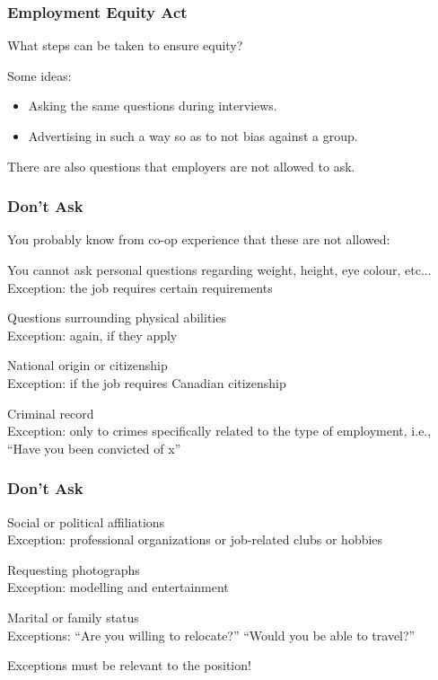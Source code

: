 \begin{frame}
\frametitle{Employment Equity Act}

What steps can be taken to ensure equity?

Some ideas:

\begin{itemize}
	\item Asking the same questions during interviews.
	\item Advertising in such a way so as to not bias against a group.
\end{itemize}

There are also questions that employers are not allowed to ask.

\end{frame}



\begin{frame}
\frametitle{Don't Ask}

You probably know from co-op experience that these are not allowed:

You cannot ask personal questions regarding weight, height, eye colour, etc...\\
\quad Exception:  the job requires certain requirements

Questions surrounding physical abilities\\
\quad Exception:  again, if they apply

National origin or citizenship\\
\quad Exception:  if the job requires Canadian citizenship

Criminal record\\
	\quad Exception: only to crimes specifically related to the type of employment, i.e., ``Have you been convicted of x''

\end{frame}



\begin{frame}
\frametitle{Don't Ask}

Social or political affiliations\\
	\quad Exception:  professional organizations or job-related clubs or hobbies

Requesting photographs\\
\quad Exception:  modelling and entertainment

Marital or family status\\
\quad Exceptions: ``Are you willing to relocate?'' ``Would you be able to travel?''


Exceptions must be relevant to the position!

\end{frame}



